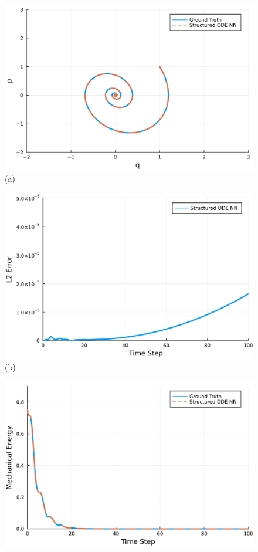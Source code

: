 \documentclass[
	parskip, 			   %
	twoside, 			   %
	DIV=14, 			   %
	BCOR=15.0mm, 		   %
	headsepline, 		   %
	open=right, 		   %
	captions=tableheading, %
	bibliography=totoc,    %
	numbers=noenddot       %
]{scrreprt}
\begin{document}
\clearpage
\begin{figure}[h!]
    \centering
    \begin{minipage}{.3\textwidth}
    \centering
    \includegraphics[width=1\linewidth]{figures/phase_portrait_compositional_ndho.pdf}
    \\(a)
    \end{minipage}%
    \begin{minipage}{.3\textwidth}
    \centering
    \includegraphics[width=1\linewidth]{figures/prediction_error_compositional_ndho.pdf}
    \\(b)
    \end{minipage}%
    \begin{minipage}{.3\textwidth}
    \centering
    \includegraphics[width=1\linewidth]{figures/Hamiltonian_evolution_compositional_ndho.pdf}

\end{minipage}
\end{figure}
\end{document}
